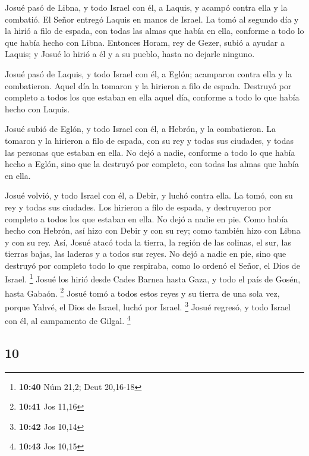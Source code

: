 \begin{paracol}{2}
 Josué pasó de Libna, y todo Israel con él, a Laquis, y
acampó contra ella y la combatió.  El Señor entregó
Laquis en manos de Israel. La tomó al segundo día y la hirió a filo de
espada, con todas las almas que había en ella, conforme a todo lo que
había hecho con Libna.  Entonces Horam, rey de Gezer,
subió a ayudar a Laquis; y Josué lo hirió a él y a su pueblo, hasta no
dejarle ninguno.

 Josué pasó de Laquis, y todo Israel con él, a Eglón;
acamparon contra ella y la combatieron.  Aquel día la
tomaron y la hirieron a filo de espada. Destruyó por completo a todos
los que estaban en ella aquel día, conforme a todo lo que había hecho
con Laquis.

 Josué subió de Eglón, y todo Israel con él, a Hebrón, y
la combatieron.  La tomaron y la hirieron a filo de
espada, con su rey y todas sus ciudades, y todas las personas que
estaban en ella. No dejó a nadie, conforme a todo lo que había hecho a
Eglón, sino que la destruyó por completo, con todas las almas que había
en ella.

 Josué volvió, y todo Israel con él, a Debir, y luchó
contra ella.  La tomó, con su rey y todas sus ciudades.
Los hirieron a filo de espada, y destruyeron por completo a todos los
que estaban en ella. No dejó a nadie en pie. Como había hecho con
Hebrón, así hizo con Debir y con su rey; como también hizo con Libna y
con su rey.  Así, Josué atacó toda la tierra, la región
de las colinas, el sur, las tierras bajas, las laderas y a todos sus
reyes. No dejó a nadie en pie, sino que destruyó por completo todo lo
que respiraba, como lo ordenó el Señor, el Dios de Israel. \footnote{\textbf{10:40}
  Núm 21,2; Deut 20,16-18}  Josué los hirió desde Cades
Barnea hasta Gaza, y todo el país de Gosén, hasta Gabaón. \footnote{\textbf{10:41}
  Jos 11,16}  Josué tomó a todos estos reyes y su tierra
de una sola vez, porque Yahvé, el Dios de Israel, luchó por Israel.
\footnote{\textbf{10:42} Jos 10,14}  Josué regresó, y
todo Israel con él, al campamento de Gilgal. \footnote{\textbf{10:43}
  Jos 10,15}

\switchcolumn
\begin{otherlanguage}{english}

\hypertarget{section-19}{%
\section{10}\label{section-19}}


\end{otherlanguage}
\end{paracol}

